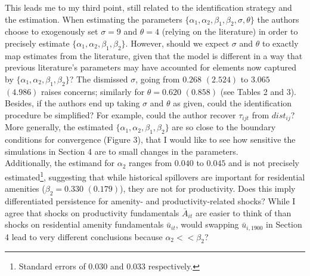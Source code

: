 \documentclass[12pt, final]{article}
\begin{document}
This leads me to my third point, still related to the identification strategy and the estimation. When estimating the parameters $\{\alpha_1, \alpha_2, \beta_1, \beta_2, \sigma, \theta\}$ the authors choose to exogenously set $\sigma = 9$ and $\theta = 4$ (relying on the literature) in order to precisely estimate $\{\alpha_1, \alpha_2, \beta_1, \beta_2\}$. However, should we expect $\sigma$ and $\theta$ to exactly map estimates from the literature, given that the model is different in a way that previous literature's parameters may have accounted for elements now captured by $\{\alpha_1, \alpha_2, \beta_1, \beta_2\}$? The dismissed $\sigma$, going from $0.268$ $(2.524)$ to $3.065$ $(4.986)$ raises concerns; similarly for $\theta = 0.620$ $(0.858)$ (see Tables 2 and 3).
Besides, if the authors end up taking $\sigma$ and $\theta$ as given, could the identification procedure be simplified? For example, could the author recover $\tau_{ijt}$ from $dist_{ij}$?
\\
More generally, the estimated $\{\alpha_1, \alpha_2, \beta_1, \beta_2\}$ are so close to the boundary conditions for convergence (Figure 3), that I would like to see how sensitive the simulations in Section 4 are to small changes in the parameters. 
\\
Additionally, the estimand for $\alpha_2$ ranges from $0.040$ to $0.045$ and is not precisely estimated\footnote{Standard errors of $0.030$ and $0.033$ respectively.}, suggesting that while historical spillovers are important for residential amenities ($\beta_2 = 0.330$ $(0.179)$), they are not for productivity. Does this imply differentiated persistence for amenity- and productivity-related shocks? While I agree that shocks on productivity fundamentals $\bar{A}_{it}$ are easier to think of than shocks on residential amenity fundamentals $\bar{u}_{it}$, would swapping $\bar{u}_{i,1900}$ in Section 4 lead to very different conclusions because $\alpha_2 << \beta_2$?  
\\
\end{document}

